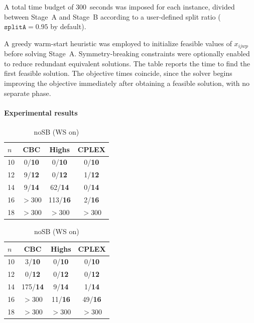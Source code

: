 \documentclass{article}
\begin{document}
A total time budget of 300~seconds was imposed for each instance, divided between
Stage~A and Stage~B according to a user-defined split ratio
($\texttt{splitA}=0.95$ by default).

A greedy warm-start heuristic was employed to initialize feasible values of $x_{ijwp}$
before solving Stage~A. Symmetry-breaking constraints were optionally enabled to
reduce redundant equivalent solutions.
The table reports the time to find the first feasible solution. The objective times coincide, since the solver begins improving the 
objective immediately after obtaining a feasible solution, with no separate phase.


\paragraph{Experimental results}
\mbox{}\par\vspace{0.5em}
\begin{table}[H]\centering\small
\begin{minipage}{.48\textwidth}\centering
\begin{tabular}{l|ccc}\toprule
$n$ & CBC & Highs & CPLEX\\\midrule
10 & 0/\textbf{10} & 0/\textbf{10} & 0/\textbf{10}\\
12 & 9/\textbf{12} & 0/\textbf{12} & 1/\textbf{12}\\
14 & 9/\textbf{14} & 62/\textbf{14} & 0/\textbf{14}\\
16 & \(>300\) & 113/\textbf{16} & 2/\textbf{16}\\
18 & \(>300\) & \(>300\) & \(>300\)\\\bottomrule
\end{tabular}
\caption{Baseline (SB+WS)}
\end{minipage}\hfill
\begin{minipage}{.48\textwidth}\centering
\begin{tabular}{l|ccc}\toprule
$n$ & CBC & Highs & CPLEX\\\midrule
10 & 3/\textbf{10} & 0/\textbf{10} & 0/\textbf{10}\\
12 & 0/\textbf{12} & 0/\textbf{12} & 0/\textbf{12}\\
14 & 175/\textbf{14} & 9/\textbf{14} & 1/\textbf{14}\\
16 & \(>300\) & 11/\textbf{16} & 49/\textbf{16}\\
18 & \(>300\) & \(>300\) & \(>300\)\\\bottomrule
\end{tabular}
\caption{noSB (WS on)}
\end{minipage}
\end{table}
\end{document}
